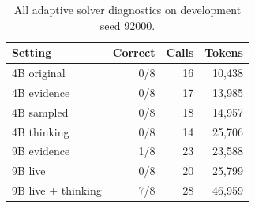 \begin{table}[t]\centering\small\setlength{\tabcolsep}{4pt}
\caption{All adaptive solver diagnostics on development seed 92000.}
\begin{tabular}{lrrr}\toprule Setting & Correct & Calls & Tokens \\ \midrule
4B original & 0/8 & 16 & 10,438 \\
4B evidence & 0/8 & 17 & 13,985 \\
4B sampled & 0/8 & 18 & 14,957 \\
4B thinking & 0/8 & 14 & 25,706 \\
9B evidence & 1/8 & 23 & 23,588 \\
9B live & 0/8 & 20 & 25,799 \\
9B live + thinking & 7/8 & 28 & 46,959 \\
\bottomrule\end{tabular}\end{table}
